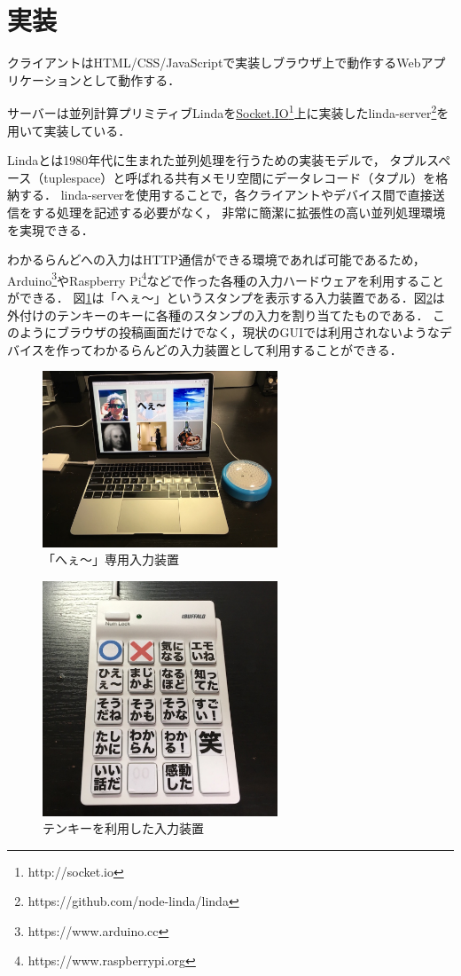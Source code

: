 \section{実装}

クライアントはHTML/CSS/JavaScriptで実装しブラウザ上で動作するWebアプリケーションとして動作する．

サーバーは並列計算プリミティブLindaを\url{Socket.IO}\footnote{http://socket.io}上に実装したlinda-server\footnote{https://github.com/node-linda/linda}を用いて実装している．

Lindaとは1980年代に生まれた並列処理を行うための実装モデルで，
タプルスペース（tuplespace）と呼ばれる共有メモリ空間にデータレコード（タプル）を格納する．
linda-serverを使用することで，各クライアントやデバイス間で直接送信をする処理を記述する必要がなく，
非常に簡潔に拡張性の高い並列処理環境を実現できる．

わかるらんどへの入力はHTTP通信ができる環境であれば可能であるため，
Arduino\footnote{https://www.arduino.cc}やRaspberry Pi\footnote{https://www.raspberrypi.org}などで作った各種の入力ハードウェアを利用することができる．
図\ref{button}は「へぇ〜」というスタンプを表示する入力装置である．図\ref{10key}は外付けのテンキーのキーに各種のスタンプの入力を割り当てたものである．
このようにブラウザの投稿画面だけでなく，現状のGUIでは利用されないようなデバイスを作ってわかるらんどの入力装置として利用することができる．

\begin{figure}[h]
\centering
\includegraphics[width=7cm]{images/button.eps}
\caption{「へぇ〜」専用入力装置}
\label{button}
\end{figure}

\begin{figure}[h]
\centering
\includegraphics[width=7cm]{images/10key.eps}
\caption{テンキーを利用した入力装置}
\label{10key}
\end{figure}